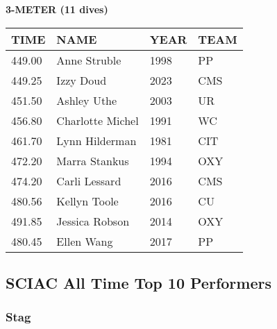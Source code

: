 \vspace{0.4cm}

\begin{center}
\begin{minipage}[t]{0.7\textwidth}
\centering
\textbf{3-METER (11 dives)}\\[0.05cm]
\begin{tabular}{@{}p{1.8cm}p{2.8cm}p{1.2cm}p{1.4cm}@{}}
\hline
\textbf{TIME} & \textbf{NAME} & \textbf{YEAR} & \textbf{TEAM} \\
\hline
449.00 & Anne Struble & 1998 & PP \\
449.25 & Izzy Doud & 2023 & CMS \\
451.50 & Ashley Uthe & 2003 & UR \\
456.80 & Charlotte Michel & 1991 & WC \\
461.70 & Lynn Hilderman & 1981 & CIT \\
472.20 & Marra Stankus & 1994 & OXY \\
474.20 & Carli Lessard & 2016 & CMS \\
480.56 & Kellyn Toole & 2016 & CU \\
491.85 & Jessica Robson & 2014 & OXY \\
480.45 & Ellen Wang & 2017 & PP \\
\hline
\end{tabular}
\end{minipage}
\end{center}

\vspace{0.4cm}

\newpage

\subsection{SCIAC All Time Top 10 Performers}
\subsubsection{Stag}

